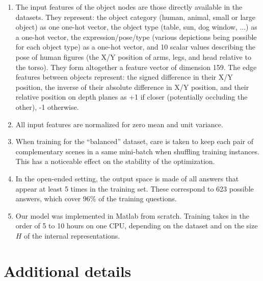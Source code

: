 \begin{enumerate}[topsep=0pt,itemsep=-1ex,partopsep=1ex,parsep=1.5ex,label={\tiny$\bullet$},leftmargin=2.0ex]
\item The input features of the object nodes are those directly available in the datasets. They represent: the object category (human, animal, small or large object) as one one-hot vector, the object type (table, sun, dog window, ...) as a one-hot vector, the expression/pose/type (various depictions being possible for each object type) as a one-hot vector, and 10 scalar values describing the pose of human figures (the X/Y position of arms, legs, and head relative to the torso). They form altogether a feature vector of dimension 159. The edge features between objects represent: the signed difference in their X/Y position, the inverse of their absolute difference in X/Y position, and their relative position on depth planes as +1 if closer (potentially occluding the other), -1 otherwise. %

\item All input features are normalized for zero mean and unit variance.
\item When training for the ``balanced'' dataset, care is taken to keep each pair of complementary scenes in a same mini-batch when shuffling training instances. This has a noticeable effect on the stability of the optimization.
\item In the open-ended setting, the output space is made of all answers that appear at least 5 times in the training set. These correspond to 623 possible answers, which cover 96\% of the training questions.
\item Our model was implemented in Matlab from scratch. Training takes in the order of 5 to 10 hours on one CPU, depending on the dataset and on the size $H$ of the internal representations.


\end{enumerate}




\section{Additional details}

